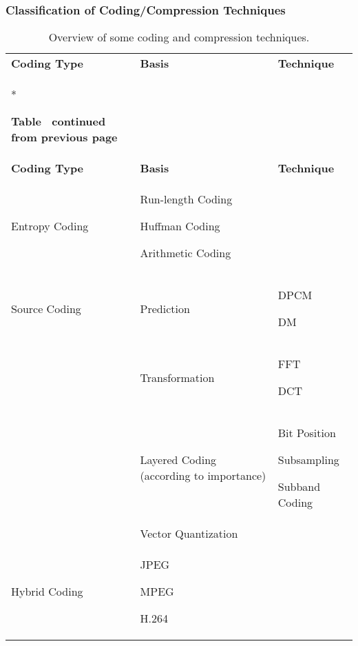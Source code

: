 \begin{landscape}
\subsubsection*{Classification of Coding/Compression Techniques}{\label{sec:compression-techniques}}
\begin{longtable}[c]{@{}p{5cm}p{8cm}p{5cm}@{}}
	\caption{Overview of some coding and compression techniques.}
	\label{tab:compression-techniques}\\
	\toprule
	\textbf{Coding Type}   & \textbf{Basis}  & \textbf{Technique} \\* \midrule
	\endfirsthead
	
	\multicolumn{3}{c}%
	{{\bfseries Table \thetable\ continued from previous page}} \\
	\toprule
	\textbf{Coding Type }   & \textbf{Basis}  & \textbf{Technique}  \\
	\endhead
	\endfoot
	
	\endlastfoot
	
	Entropy Coding & {Run-length Coding\par Huffman Coding\par  Arithmetic Coding\par}      \\
	\hline
	Source Coding  & {Prediction\par}   & {DPCM\par DM\par}           \\
	& Transformation\par  & FFT\par DCT\par \\
	
	& {Layered Coding (according to importance)\par}   & {Bit Position \par Subsampling\par Subband Coding\par }   \\
	& Vector Quantization\par & \\
	\hline

	Hybrid Coding  & {JPEG\par MPEG\par H.264\par}  &  \\
	 \bottomrule
\end{longtable}
\end{landscape}

